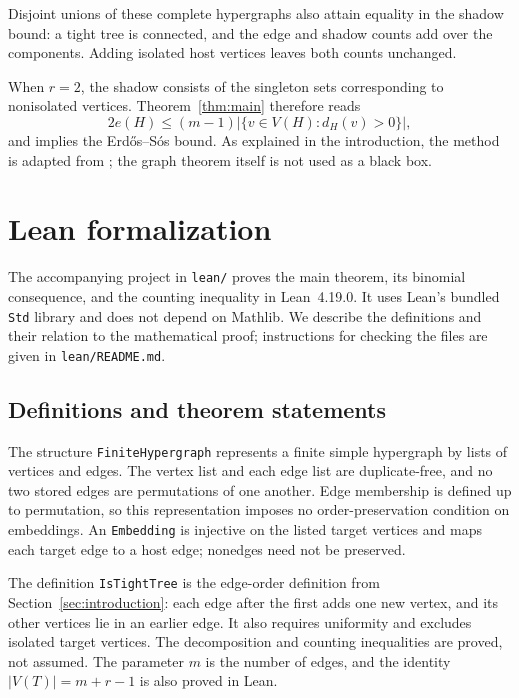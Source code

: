 \documentclass[11pt]{article}
\numberwithin{equation}{section}
\theoremstyle{definition}
\begin{document}
Disjoint unions of these complete hypergraphs also attain equality in
the shadow bound: a tight tree is connected, and the edge and shadow
counts add over the components.  Adding isolated host vertices leaves
both counts unchanged.

When $r=2$, the shadow consists of the singleton sets corresponding to
nonisolated vertices.  Theorem~\ref{thm:main} therefore reads
\[
 2e(H)\leq(m-1)|\{v\in V(H):d_H(v)>0\}|,
\]
and implies the Erd\H{o}s--S\'os bound.  As explained in the
introduction, the method is adapted from \cite{Erdos548Repository};
the graph theorem itself is not used as a black box.

\section{Lean formalization}
\label{sec:formalization}

The accompanying project in \texttt{lean/} proves the main theorem,
its binomial consequence, and the counting inequality in Lean~4.19.0.
It uses Lean's bundled \texttt{Std} library and does not depend on
Mathlib.  We describe the definitions and their relation to the
mathematical proof; instructions for checking the files are given in
\texttt{lean/README.md}.

\subsection{Definitions and theorem statements}

The structure \texttt{FiniteHypergraph} represents a finite simple
hypergraph by lists of vertices and edges.  The vertex list and each
edge list are duplicate-free, and no two stored edges are permutations
of one another.  Edge membership is defined up to permutation, so this
representation imposes no order-preservation condition on embeddings.
An \texttt{Embedding} is injective on the listed target vertices and
maps each target edge to a host edge; nonedges need not be preserved.

The definition \texttt{IsTightTree} is the edge-order definition from
Section~\ref{sec:introduction}: each edge after the first adds one
new vertex, and its other vertices lie in an earlier edge.  It also
requires uniformity and excludes isolated target vertices.  The
decomposition and counting inequalities are proved, not assumed.
The parameter $m$ is the number of edges, and the identity
$|V(T)|=m+r-1$ is also proved in Lean.
\end{document}
